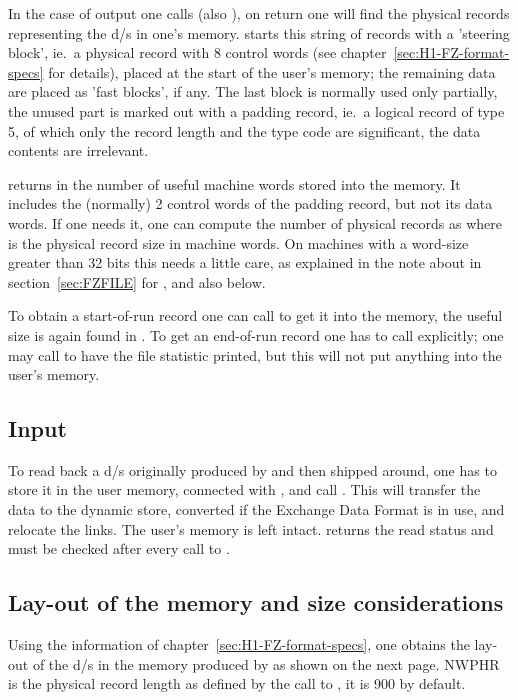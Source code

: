In the case of output one calls  (also ),
on return one will find the physical records representing
the d/s in one's memory.
 starts this string of records with a 'steering block',
ie.~a physical record with 8 control words
(see chapter~\ref{sec:H1-FZ-format-specs} for details),
placed at the start of the user's memory;
the remaining data are placed as 'fast blocks', if any.
The last block is normally used only partially,
the unused part is marked out with a padding record,
ie.~a logical record of type 5,
of which only the record length and the type code are significant,
the data contents are irrelevant.

 returns in  the number of useful machine words
stored into the memory.
It includes the (normally) 2 control words of the padding record,
but not its data words.
If one needs it,
one can compute the number of physical records
as    where 
is the physical record size in machine words.
On machines with a word-size greater than 32 bits this needs
a little care,
as explained in the note about  in section~\ref{sec:FZFILE}
for ,
and also below.

To obtain a start-of-run record one can call 
to get it into the memory, the useful size is again found
in .
To get an end-of-run record one has to call  explicitly;
one may call  to have the file statistic printed,
but this will not put anything into the user's memory.

\subsection*{Input}

To read back a d/s originally produced by 
and then shipped around,
one has to store it in the user memory,
connected with ,
and call .
This will transfer the data to the dynamic store,
converted if the Exchange Data Format is in use,
and relocate the links.
The user's memory is left intact.
 returns the read status and must be checked after
every call to .

\subsection*{Lay-out of the memory and size considerations}

Using the information of chapter~\ref{sec:H1-FZ-format-specs},
one obtains the lay-out of the d/s in the memory
produced by  as shown on the next page.
NWPHR is the physical record length as defined by the call
to , it is 900 by default.

